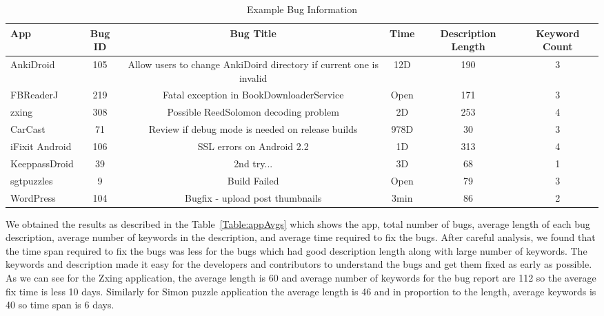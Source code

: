\documentclass{sig-alternate}
\begin{document}
\begin{table}[h]
\begin{center}
\caption{Example Bug Information}
\label{Table:appKeyword}
  \begin{tabular}{ | l | c | c | c | c | c | } \hline

     \bfseries App  & \bfseries Bug ID & \bfseries Bug Title &  \bfseries Time & \bfseries Description Length & \bfseries Keyword Count \\ \hline
 
 
	AnkiDroid & 105 & Allow users to change AnkiDoird directory if current one is invalid & 12D & 190 & 3  \\ \hline	
	FBReaderJ & 219 & Fatal exception in BookDownloaderService & Open & 171 & 3	\\ \hline
 	zxing & 308 & Possible ReedSolomon decoding problem  & 2D & 253 & 4	\\ \hline
	CarCast & 71 & Review if debug mode is needed on release builds & 978D & 30 & 3	\\ \hline
 	iFixit Android & 106 & SSL errors on Android 2.2 & 1D & 313 & 4	\\ \hline
 	KeeppassDroid & 39 & 2nd try... & 3D & 68 & 1	\\ \hline
 	sgtpuzzles & 9 & Build Failed & Open  & 79 & 3	\\ \hline
	WordPress & 104 & Bugfix - upload post thumbnails & 3min & 86 & 2	\\ \hline
 
  \end{tabular}
  \end{center}
\end{table}



We obtained the results as described in the Table~\ref{Table:appAvgs} which shows the app, total number of bugs, average length of each bug description, average number of keywords in the description, and average time required to fix the bugs. After careful analysis, we found that the time span required to fix the bugs was less for the bugs which had good description length along with large number of keywords. The keywords and description made it easy for the developers and contributors to understand the bugs and get them fixed as early as possible. As we can see for the Zxing application, the average length is 60 and average number of keywords for the bug report are 112 so the average fix time is less 10 days. Similarly for Simon puzzle application the average length is 46 and in proportion to the length, average keywords is 40 so time span is 6 days.
\end{document}
